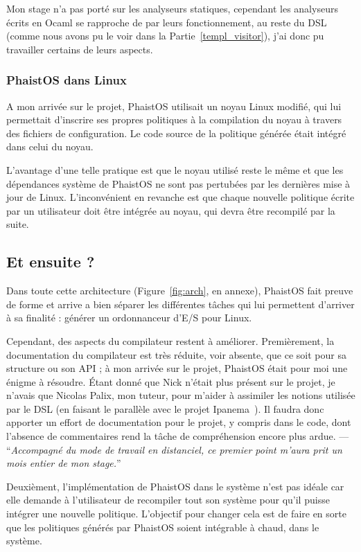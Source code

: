 Mon stage n'a pas porté sur les analyseurs statiques, cependant les analyseurs 
écrits en Ocaml se rapproche de par leurs fonctionnement, au reste du DSL 
(comme nous avons pu le voir dans la Partie~\ref{templ_visitor}), j'ai donc pu 
travailler certains de leurs aspects.

\subsubsection{PhaistOS dans Linux}

A mon arrivée sur le projet, PhaistOS utilisait un noyau Linux modifié, qui lui 
permettait d'inscrire ses propres politiques à la compilation du noyau à 
travers des fichiers de configuration. Le code source de la politique générée 
était intégré dans celui du noyau.

L'avantage d'une telle pratique est que le noyau utilisé reste le même et que 
les dépendances système de PhaistOS ne sont pas pertubées par les dernières 
mise à jour de Linux. L'inconvénient en revanche est que chaque nouvelle 
politique écrite par un utilisateur doit être intégrée au noyau, qui devra être 
recompilé par la suite.

\subsection{Et ensuite ?}

Dans toute cette architecture (Figure~\ref{fig:arch}, en annexe), PhaistOS fait 
preuve de forme et arrive a bien séparer les différentes tâches qui lui 
permettent d'arriver à sa finalité : générer un ordonnanceur d'E/S pour Linux.

Cependant, des aspects du compilateur restent à améliorer. Premièrement, la 
documentation du compilateur est très réduite, voir absente, que ce soit pour 
sa structure ou son API ; à mon arrivée sur le projet, PhaistOS était pour moi 
une énigme à résoudre. Étant donné que Nick n'était plus présent sur le projet, 
je n'avais que Nicolas Palix, mon tuteur, pour m'aider à assimiler les notions 
utilisée par le DSL (en faisant le parallèle avec le projet Ipanema~\cite
{lepers2020provable}). Il faudra donc apporter un effort de documentation pour 
le projet, y compris dans le code, dont l'absence de commentaires rend la tâche 
de compréhension encore plus ardue. --- ``\textit{Accompagné du mode de travail 
en distanciel, ce premier point m'aura prit un mois entier de mon stage.}''

Deuxièment, l'implémentation de PhaistOS dans le système n'est pas idéale car 
elle demande à l'utilisateur de recompiler tout son système pour qu'il puisse 
intégrer une nouvelle politique. L'objectif pour changer cela est de faire en 
sorte que les politiques générés par PhaistOS soient intégrable à chaud, dans 
le système.

